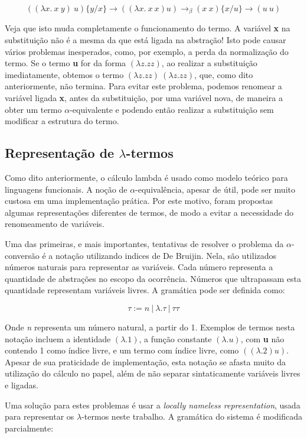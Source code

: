 \[ ((\lambda x.\ x\ y)\ u)\{y/x\} \rightarrow ((\lambda x.\ x\ x) u)
\rightarrow_\beta (x\ x)\{x/u\} \rightarrow (u\ u) \]

Veja que isto muda completamente o funcionamento do termo. A variável \textbf{x}
na substituição não é a mesma da que está ligada na abstração! Isto pode causar
vários problemas inesperados, como, por exemplo, a perda da normalização do
termo. Se o termo \textbf{u} for da forma $(\lambda z. z z)$, ao realizar a
substituição imediatamente, obtemos o termo $(\lambda z. z z)\ (\lambda z. z z)$,
que, como dito anteriormente, não termina.
Para evitar este problema, podemos renomear a variável ligada \textbf{x}, antes
da substituição, por uma variável nova, de maneira a obter um termo
$\alpha$-equivalente e podendo então realizar a substituição sem modificar a
estrutura do termo.

\subsection{Representação de $\lambda$-termos}
\label{sub:int_lnr}

Como dito anteriormente, o cálculo lambda é usado como modelo teórico para
linguagens funcionais. A noção de $\alpha$-equivalência, apesar de útil, pode ser
muito custosa em uma implementação prática. Por este motivo, foram propostas
algumas representações diferentes de termos, de modo a evitar a necessidade do
renomeamento de variáveis. 

Uma das primeiras, e mais importantes, tentativas de resolver o problema da
$\alpha$-conversão é a notação utilizando indices de De Bruijin. Nela, são
utilizados números naturais para representar as variáveis. Cada número
representa a quantidade de abstrações no escopo da ocorrência. Números que
ultrapassam esta quantidade representam variáveis livres. A gramática pode ser
definida como:

\[ \tau := n\ |\ \lambda . \tau\ |\ \tau \tau \]

Onde \textit{n} representa um número natural, a partir do 1. Exemplos de termos
nesta notação incluem a identidade $(\lambda. 1)$, a função constante $(\lambda.
u)$, com \textbf{u} não contendo 1 como índice livre, e um termo com índice
livre, como $((\lambda.2) u)$. Apesar de sua praticidade de implementação, esta
notação se afasta muito da utilização do cálculo no papel, além de não separar
sintaticamente variáveis livres e ligadas.

Uma solução para estes problemas é usar a \textit{locally nameless
representation}, usada para representar os $\lambda$-termos neste trabalho.
A gramática do sistema é modificada parcialmente:

